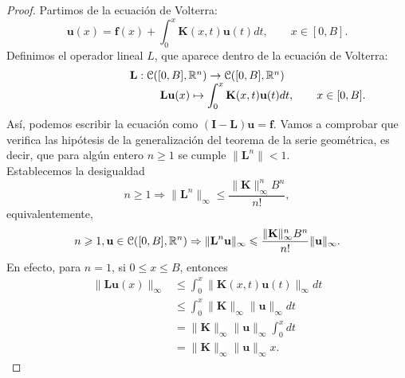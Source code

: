\begin{proof}
	Partimos de la ecuación de Volterra:
	\begin{equation}
		\textbf{u}(x) = \textbf{f}(x) + \int_0^x \textbf{K}(x,t)\textbf{u}(t)dt, \qquad x \in [0,B].
	\end{equation}
	Definimos el operador lineal $L$, que aparece dentro de la ecuación de Volterra:
	\begin{equation}
		\begin{array}{c}
			\textbf{L}: \mathcal{C}([0,B],\mathbb{R}^n) \rightarrow \mathcal{C}([0,B],\mathbb{R}^n) \\
			\qquad \qquad \qquad \qquad \qquad \textbf{L}\textbf{u}(x) \mapsto \displaystyle \int_{0}^{x} \textbf{K}(x,t)\textbf{u}(t)dt, \qquad x \in [0,B].
		\end{array}
	\end{equation}
	Así, podemos escribir la ecuación como $(\textbf{I}-\textbf{L})\textbf{u} = \textbf{f}$.
	Vamos a comprobar que verifica las hipótesis de la generalización del teorema de la serie geométrica, es decir, que para algún entero $n \geqslant 1$ se cumple $\lVert \textbf{L}^n \rVert < 1$.\\
	Establecemos la desigualdad
	\begin{equation}
		n \geqslant 1 \Rightarrow \lVert \textbf{L}^n \rVert_\infty \leqslant \dfrac{\lVert \textbf{K} \rVert_\infty^nB^n}{n!},
	\end{equation}
	equivalentemente,
	\begin{equation}\label{eq:ref2}
		n \geqslant 1, \textbf{u} \in \mathcal{C}([0,B],\mathbb{R}^n) \Rightarrow \lVert \textbf{L}^n\textbf{u} \rVert_\infty \leqslant \dfrac{\lVert \textbf{K} \rVert_\infty^nB^n}{n!}\lVert \textbf{u} \rVert_\infty.
	\end{equation}
	En efecto, para $n = 1$, si $0 \leqslant x \leqslant B$, entonces
	\begin{equation}
		\begin{split}
			\lVert \textbf{L}\textbf{u}(x) \rVert_\infty & \leqslant \int_{0}^{x} \lVert \textbf{K}(x,t)\textbf{u}(t)\rVert_\infty dt \\
			& \leqslant \int_{0}^{x} \lVert \textbf{K} \rVert_\infty \lVert \textbf{u} \rVert_\infty dt\\
			& = \lVert \textbf{K} \rVert_\infty \lVert \textbf{u} \rVert_\infty \int_{0}^{x}dt\\
			& = \lVert \textbf{K} \rVert_\infty \lVert \textbf{u} \rVert_\infty x.
		\end{split}
	\end{equation}

\end{proof}
